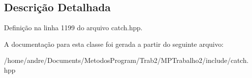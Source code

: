 \subsection{Descrição Detalhada}


Definição na linha 1199 do arquivo catch.\+hpp.



A documentação para esta classe foi gerada a partir do seguinte arquivo\+:\begin{DoxyCompactItemize}
\item 
/home/andre/\+Documents/\+Metodos\+Program/\+Trab2/\+M\+P\+Trabalho2/include/catch.\+hpp\end{DoxyCompactItemize}
